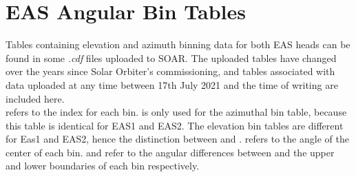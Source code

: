 {}
\appendix
\chapter{EAS Angular Bin Tables}
\label{appendixlabel1}
Tables containing elevation and azimuth binning data for both EAS heads can be found in some \textit{.cdf} files uploaded to SOAR. The uploaded tables have changed over the years since Solar Orbiter's commissioning, and tables associated with data uploaded at any time between 17th July 2021 and the time of writing are included here.
\\

 refers to the index for each bin.  is only used for the azimuthal bin table, because this table is identical for EAS1 and EAS2. The elevation bin tables are different for Eas1 and EAS2, hence the distinction between  and .  refers to the angle of the center of each bin.  and  refer to the angular differences between  and the upper and lower boundaries of each bin respectively.
\\




